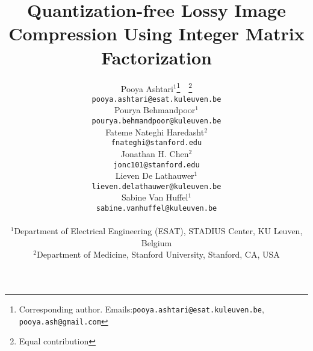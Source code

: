 \documentclass{article}
\title{Quantization-free Lossy Image Compression Using Integer Matrix Factorization}
\author{%
Pooya Ashtari$^{1}$\thanks{Corresponding author. Emails:\texttt{pooya.ashtari@esat.kuleuven.be}, \texttt{pooya.ash@gmail.com}}\ \ \thanks{Equal contribution} \\
\texttt{pooya.ashtari@esat.kuleuven.be} \\
\vspace{-20pt}
\And
Pourya Behmandpoor$^{1}$\footnotemark[2] \\
\texttt{pourya.behmandpoor@kuleuven.be} \\
\vspace{-20pt}
\And
Fateme Nateghi Haredasht$^{2}$ \\
\texttt{fnateghi@stanford.edu} \\
\vspace{-20pt}
\And
Jonathan H. Chen$^{2}$ \\
\texttt{jonc101@stanford.edu} \\
\vspace{-20pt}
\And
Lieven De Lathauwer$^{1}$ \\
\texttt{lieven.delathauwer@kuleuven.be} \\
\And
Sabine Van Huffel$^{1}$ \\
\texttt{sabine.vanhuffel@kuleuven.be} \\
\And
\vspace{-20pt} \\
\small{$^{1}$Department of Electrical Engineering (ESAT), STADIUS Center, KU Leuven, Belgium} \\
\small{$^{2}$Department of Medicine, Stanford University, Stanford, CA, USA} \\
}
\begin{document}
\maketitle

















\medskip

{
\small


}



\appendix




\end{document}
